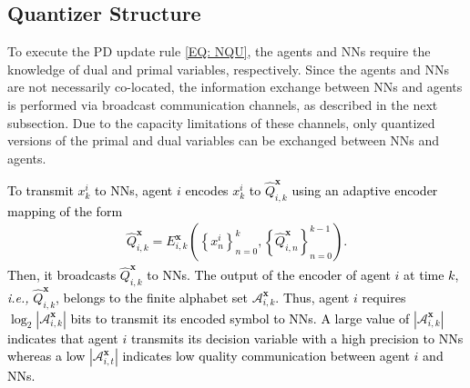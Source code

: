 \documentclass[10pt,twocolumn,twoside]{IEEEtran}
\begin{document}
\subsection{Quantizer Structure}

To execute the PD update rule \eqref{EQ: NQU}, the agents and NNs require the knowledge of dual and primal variables, respectively. 
Since the agents and NNs are not necessarily co-located, the information exchange between NNs and agents is performed via broadcast communication channels, as described in the next subsection. 
Due to the capacity limitations of these channels,  only quantized versions of the primal and dual variables can be exchanged between NNs and agents. 

\textcolor{black}{To transmit $x^i_k$ to NNs, agent $i$ encodes $x^i_k$ to $\hat{Q}^{{\ensuremath{\boldsymbol{{x}}}}}_{i,k}$ using an adaptive encoder mapping  of the form
\begin{eqnarray}
\hat{Q}^{{\ensuremath{\boldsymbol{{x}}}}}_{i,k}=E_{i,k}^{{\ensuremath{\boldsymbol{{x}}}}}{\left({\left\{x^i_n\right\}_{n=0}^k,\left\{\hat{Q}^{{\ensuremath{\boldsymbol{{x}}}}}_{i,n}\right\}_{n=0}^{k-1}}\right)}. \nonumber
\end{eqnarray} 
 Then, it broadcasts $\hat{Q}^{{\ensuremath{\boldsymbol{{x}}}}}_{i,k}$ to NNs. The output of the encoder of agent $i$ at time $k$, \emph{i.e.,} $\hat{Q}^{{\ensuremath{\boldsymbol{{x}}}}}_{i,k}$, belongs to the finite alphabet set $\mathcal{A}^{{\ensuremath{\boldsymbol{{x}}}}}_{i,k}$. Thus, agent $i$ requires $\log_2{\left|{\mathcal{A}^{{\ensuremath{\boldsymbol{{x}}}}}_{i,k}}\right|}$ bits to transmit its encoded symbol to NNs.    A large value of ${\left|{\mathcal{A}^{{\ensuremath{\boldsymbol{{x}}}}}_{i,k}}\right|}$ indicates that agent $i$ transmits its decision variable with a high precision to NNs whereas a low ${\left|{\mathcal{A}^{{\ensuremath{\boldsymbol{{x}}}}}_{i,t}}\right|}$  indicates low quality communication between agent $i$ and NNs.}
\end{document}
